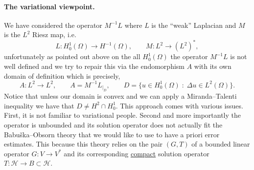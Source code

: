 \documentclass[11pt,a4paper]{article}
\newcommand{\uzt}[1]{\textcolor{teal!80!black}{#1}}   %
\begin{document}
\paragraph{\uzt{The variational viewpoint.}}
We have considered the operator $M^{-1}L$ where $L$ is the ``weak'' Laplacian and $M$ is the $L^2$ Riesz map, i.e.
\begin{equation}
	L:H^1_0(\Omega) \to H^{-1}(\Omega),\qquad M:L^2 \to (L^2)^*,
\end{equation}
unfortunately as pointed out above on the all $H^1_0(\Omega)$ the operator $M^{-1}L$ is not well defined and we try to repair this via the endomorphism $A$ with its own domain of definition which is precisely,
\begin{equation}
	A: L^2 \to L^2, \qquad A=M^{-1}L_{|_D}, \qquad D=\{u \in H^1_0(\Omega) \; : \; \Delta u \in L^2(\Omega)\}.
\end{equation}
Notice that unless our domain is convex and we can apply a Miranda--Talenti inequality we have that $D \neq H^2\cap H^1_0$.
This approach comes with various issues. First, it is not familiar to variational people. Second and more importantly  the operator is unbounded and its solution operator does not actually fit the Babu\v{s}ka--Obsorn theory that we would like to use to have a priori error estimates. This because this theory relies on the pair $(G, T)$ of a bounded linear operator $G: V \to V^*$ and its corresponding \underline{compact} solution operator $T:\mathcal{H} \to B \subset \mathcal{H}$.
\end{document}
